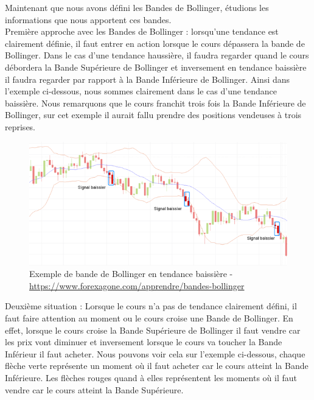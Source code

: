 Maintenant que nous avons défini les Bandes de Bollinger, étudions les informations que nous apportent ces bandes. \\

Première approche avec les Bandes de Bollinger : lorsqu'une tendance est clairement définie, il faut entrer en action lorsque le cours dépassera la bande de Bollinger. Dans le cas d'une tendance haussière, il faudra regarder quand le cours débordera la Bande Supérieure de Bollinger et inversement en tendance baissière il faudra regarder par rapport à la Bande Inférieure de Bollinger. Ainsi dans l'exemple ci-dessous, nous sommes clairement dans le cas d'une tendance baissière. Nous remarquons que le cours franchit trois fois la Bande Inférieure de Bollinger, sur cet exemple il aurait fallu prendre des positions vendeuses à trois reprises. 

\begin{figure}[H]
  \center
  \includegraphics[scale=0.5]{../graph/bollingerBaissier.png} 
  \caption{Exemple de bande de Bollinger en tendance baissière - \url{https://www.forexagone.com/apprendre/bandes-bollinger}}
\end{figure} 
 
 
Deuxième situation : Lorsque le cours n'a pas de tendance clairement défini, il faut faire attention au moment ou le cours croise une Bande de Bollinger. En effet, lorsque le cours croise la Bande Supérieure de Bollinger il faut vendre car les prix vont diminuer et inversement lorsque le cours va toucher la Bande Inférieur il faut acheter. Nous pouvons voir cela sur l'exemple ci-dessous, chaque flèche verte représente un moment où il faut acheter car le cours atteint la Bande Inférieure. Les flèches rouges quand à elles représentent les moments où il faut vendre car le cours atteint la Bande Supérieure.  

